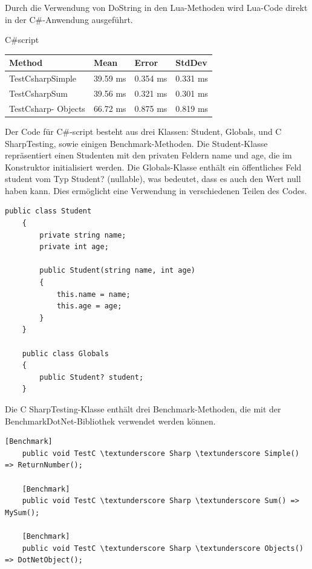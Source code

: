 Durch die Verwendung von DoString in den Lua-Methoden wird Lua-Code direkt in der C\#-Anwendung ausgeführt.

\newpage
C\#script
        \begin{table}[H]
            \begin{tabular}{|p{3.5cm}|p{3cm}|p{3cm}|p{3cm}|}
            \hline
                Method & Mean & Error & StdDev \\ \hline
                TestCsharpSimple & 39.59 ms & 0.354 ms & 0.331 ms \\ \hline
                TestCsharpSum & 39.56 ms & 0.321 ms & 0.301 ms \\ \hline
                TestCsharp-
                Objects & 66.72 ms & 0.875 ms & 0.819 ms \\ \hline
            \end{tabular}
        \end{table}

Der Code für C\#-script besteht aus drei Klassen: Student, Globals, und C \textunderscore SharpTesting, sowie einigen Benchmark-Methoden.
Die Student-Klasse repräsentiert einen Studenten mit den privaten Feldern name und age, die im Konstruktor initialisiert werden.
Die Globals-Klasse enthält ein öffentliches Feld student vom Typ Student? (nullable), was bedeutet, dass es auch den Wert null haben kann. Dies ermöglicht eine Verwendung in verschiedenen Teilen des Codes.

\begin{lstlisting}[language={[Sharp]C}, caption=C\#Scripting Klassen, label=lst:imp:cscm]
    public class Student
    {       
        private string name;
        private int age;

        public Student(string name, int age)
        {
            this.name = name;
            this.age = age;
        }
    }

    public class Globals
    {
        public Student? student;
    }
\end{lstlisting}


Die C \textunderscore SharpTesting-Klasse enthält drei Benchmark-Methoden, die mit der BenchmarkDotNet-Bibliothek verwendet werden können. 
\begin{lstlisting}[language={[Sharp]C}, caption=C\#Scripting Benchmark, label=lst:imp:cscBench]
    [Benchmark]
    public void TestC \textunderscore Sharp \textunderscore Simple() => ReturnNumber();

    [Benchmark]
    public void TestC \textunderscore Sharp \textunderscore Sum() => MySum();

    [Benchmark]
    public void TestC \textunderscore Sharp \textunderscore Objects() => DotNetObject();
\end{lstlisting}
 

